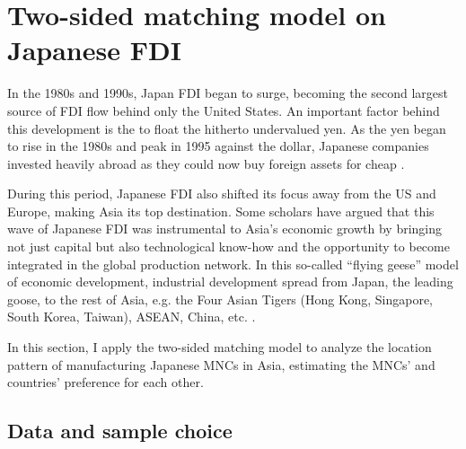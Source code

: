 \chapter{Two-sided matching model on Japanese FDI}
\label{chap:FDI}

In the 1980s and 1990s, Japan FDI began to surge, becoming the second largest
source of FDI flow behind only the United States. An important factor behind
this development is the to float the hitherto undervalued yen. As the yen began
to rise in the 1980s and peak in 1995 against the dollar,
Japanese companies invested heavily abroad as they could now buy foreign assets
for cheap \citet{Delios2001}.

During this period, Japanese FDI also shifted its focus away from the US and
Europe, making Asia its top destination. Some scholars
have argued that this wave of Japanese FDI was instrumental to Asia's
economic growth by bringing not just capital but also technological know-how and
the opportunity to become integrated in the global production network. In this
so-called ``flying geese'' model of economic development, industrial development
spread from Japan, the leading goose, to the rest of Asia, e.g. the Four Asian
Tigers (Hong Kong, Singapore, South Korea, Taiwan), ASEAN, China, etc.
\citep{Bernard1995, Kojima2000}.

In this section, I apply the two-sided matching model to analyze the
location pattern of manufacturing Japanese MNCs in Asia, estimating the MNCs'
and countries' preference for each other.

\section{Data and sample choice}

